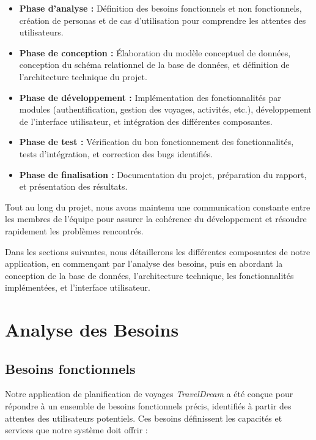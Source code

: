 \documentclass[a4paper,12pt]{article}
\begin{document}
\begin{itemize}
  \item \textbf{Phase d'analyse :} Définition des besoins fonctionnels et non fonctionnels, création de personas et de cas d'utilisation pour comprendre les attentes des utilisateurs.
  
  \item \textbf{Phase de conception :} Élaboration du modèle conceptuel de données, conception du schéma relationnel de la base de données, et définition de l'architecture technique du projet.
  
  \item \textbf{Phase de développement :} Implémentation des fonctionnalités par modules (authentification, gestion des voyages, activités, etc.), développement de l'interface utilisateur, et intégration des différentes composantes.
  
  \item \textbf{Phase de test :} Vérification du bon fonctionnement des fonctionnalités, tests d'intégration, et correction des bugs identifiés.
  
  \item \textbf{Phase de finalisation :} Documentation du projet, préparation du rapport, et présentation des résultats.
\end{itemize}

Tout au long du projet, nous avons maintenu une communication constante entre les membres de l'équipe pour assurer la cohérence du développement et résoudre rapidement les problèmes rencontrés.

Dans les sections suivantes, nous détaillerons les différentes composantes de notre application, en commençant par l'analyse des besoins, puis en abordant la conception de la base de données, l'architecture technique, les fonctionnalités implémentées, et l'interface utilisateur.


\section{Analyse des Besoins}

\subsection{Besoins fonctionnels}

Notre application de planification de voyages \textit{TravelDream} a été conçue pour répondre à un ensemble de besoins fonctionnels précis, identifiés à partir des attentes des utilisateurs potentiels. Ces besoins définissent les capacités et services que notre système doit offrir :
\end{document}
